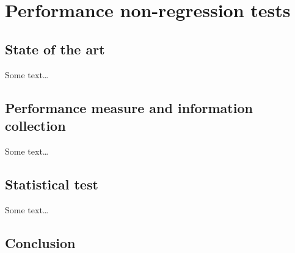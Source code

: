 \chapter{Performance non-regression tests}%
\label{chapter:experiment:tests}

    \section{State of the art}%
        Some text\dots

    \section{Performance measure and information collection}%
    \label{sec:performance_measure_and_information_collection}
        Some text\dots

    \section{Statistical test}%
    \label{sec:statistical_test}
        Some text\dots

    \section{Conclusion}%
    \label{sec:conclusion}
